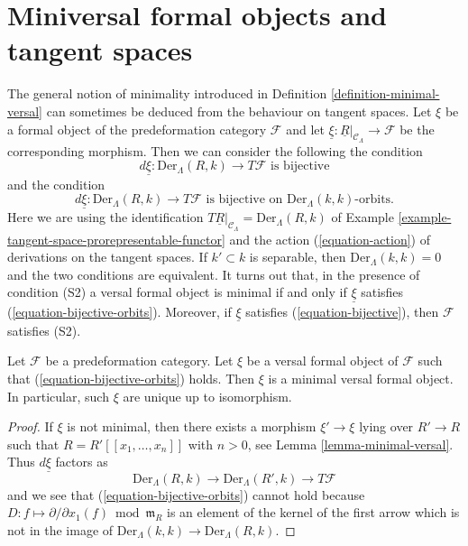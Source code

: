 \section{Miniversal formal objects and tangent spaces}
\label{section-miniversal-objects-existence}

\noindent
The general notion of minimality introduced in
Definition \ref{definition-minimal-versal}
can sometimes be deduced from the behaviour on tangent spaces.
Let $\xi$ be a formal object of the predeformation category
$\mathcal{F}$ and let
$\underline{\xi} : \underline{R}|_{\mathcal{C}_\Lambda} \to \mathcal{F}$
be the corresponding morphism. Then we can consider the following
the condition
\begin{equation}
\label{equation-bijective}
d\underline{\xi} : \text{Der}_\Lambda(R, k) \to T\mathcal{F} 
\text{ is bijective}
\end{equation}
and the condition
\begin{equation}
\label{equation-bijective-orbits}
d\underline{\xi} : \text{Der}_\Lambda(R, k) \to T\mathcal{F} 
\text{ is bijective on }\text{Der}_\Lambda(k, k)\text{-orbits.}
\end{equation}
Here we are using the identification
$T\underline{R}|_{\mathcal{C}_\Lambda} = \text{Der}_\Lambda(R, k)$ of
Example \ref{example-tangent-space-prorepresentable-functor}
and the action (\ref{equation-action}) of derivations
on the tangent spaces. If $k' \subset k$ is separable, then
$\text{Der}_\Lambda(k, k) = 0$ and the two conditions are equivalent.
It turns out that, in the presence of condition (S2) a versal formal
object is minimal if and only if $\underline{\xi}$ satisfies
(\ref{equation-bijective-orbits}).
Moreover, if $\underline{\xi}$ satisfies (\ref{equation-bijective}), then
$\mathcal{F}$ satisfies (S2).

\begin{lemma}
\label{lemma-miniversal-object-unique}
Let $\mathcal{F}$ be a predeformation category.
Let $\xi$ be a versal formal object of $\mathcal{F}$ such that
(\ref{equation-bijective-orbits}) holds.
Then $\xi$ is a minimal versal formal object.
In particular, such $\xi$ are unique up to isomorphism.
\end{lemma}

\begin{proof}
If $\xi$ is not minimal, then there exists a morphism
$\xi' \to \xi$ lying over $R' \to R$ such that
$R = R'[[x_1, \ldots, x_n]]$ with $n > 0$, see
Lemma \ref{lemma-minimal-versal}.
Thus $d\underline{\xi}$ factors as
$$
\text{Der}_\Lambda(R, k) \to
\text{Der}_\Lambda(R', k) \to T\mathcal{F}
$$
and we see that (\ref{equation-bijective-orbits}) cannot hold
because $D : f \mapsto \partial/\partial x_1(f) \bmod \mathfrak m_R$
is an element of the kernel of the first arrow which is not in the image of
$\text{Der}_\Lambda(k, k) \to \text{Der}_\Lambda(R, k)$.
\end{proof}

